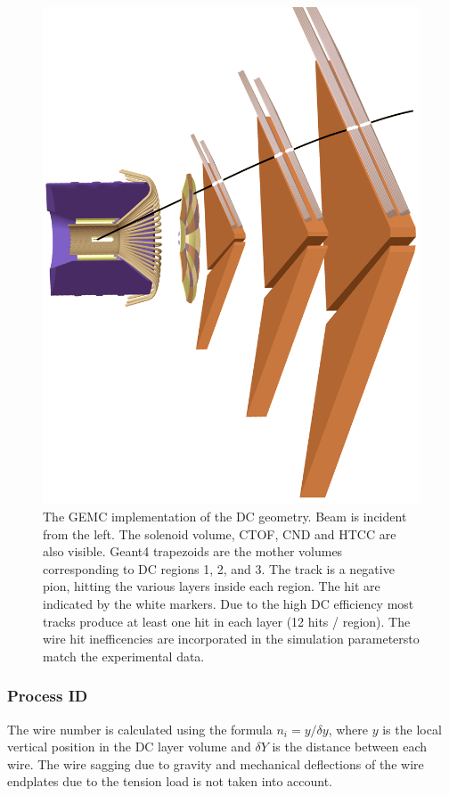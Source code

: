 \begin{figure}[h]
	\centering
	\includegraphics[width=0.99\columnwidth,keepaspectratio]{img/dcGeometry.png}
	\caption{The GEMC implementation of the DC geometry. Beam is incident from the left. The solenoid volume, CTOF, CND and HTCC are also visible.
             Geant4 trapezoids are the mother volumes corresponding to DC regions 1, 2, and 3. The track is a negative pion,
			 hitting the various layers inside each region. The hit are indicated by the white markers. Due to the high DC
             efficiency most tracks produce at least one hit in each layer (12 hits / region).
             The wire hit inefficencies are incorporated in the simulation parametersto match the experimental data.}
	\label{fig:dcGeometry}
\end{figure}


\subsubsection{Process ID}
The wire number is calculated using the formula $n_i = y / \delta y$, where $y$ is the local vertical position in the DC layer volume
and $\delta Y$ is the distance between each wire.
The wire sagging due to gravity and mechanical deflections of the wire endplates due to the tension load is not taken into account.

